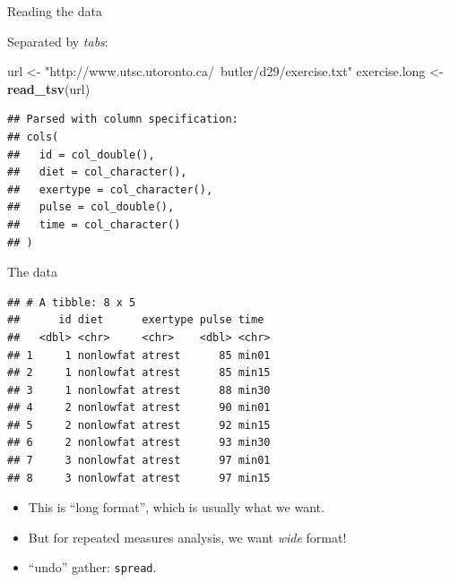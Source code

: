 \documentclass[
  ignorenonframetext,
]{beamer}
\newenvironment{Shaded}{\begin{snugshade}}{\end{snugshade}}
\newcommand{\DecValTok}[1]{\textcolor[rgb]{0.00,0.00,0.81}{#1}}
\newcommand{\KeywordTok}[1]{\textcolor[rgb]{0.13,0.29,0.53}{\textbf{#1}}}
\newcommand{\NormalTok}[1]{#1}
\newcommand{\OperatorTok}[1]{\textcolor[rgb]{0.81,0.36,0.00}{\textbf{#1}}}
\newcommand{\StringTok}[1]{\textcolor[rgb]{0.31,0.60,0.02}{#1}}
\begin{document}
\begin{frame}[fragile]{Reading the data}
\protect\hypertarget{reading-the-data-1}{}

Separated by \emph{tabs}:

\begin{Shaded}
\begin{Highlighting}[]
\NormalTok{url <-}\StringTok{ "http://www.utsc.utoronto.ca/~butler/d29/exercise.txt"}
\NormalTok{exercise.long <-}\StringTok{ }\KeywordTok{read_tsv}\NormalTok{(url)}
\end{Highlighting}
\end{Shaded}

\begin{verbatim}
## Parsed with column specification:
## cols(
##   id = col_double(),
##   diet = col_character(),
##   exertype = col_character(),
##   pulse = col_double(),
##   time = col_character()
## )
\end{verbatim}

\end{frame}

\begin{frame}[fragile]{The data}
\protect\hypertarget{the-data-11}{}

\footnotesize

\begin{Shaded}
\end{Shaded}

\begin{verbatim}
## # A tibble: 8 x 5
##      id diet      exertype pulse time 
##   <dbl> <chr>     <chr>    <dbl> <chr>
## 1     1 nonlowfat atrest      85 min01
## 2     1 nonlowfat atrest      85 min15
## 3     1 nonlowfat atrest      88 min30
## 4     2 nonlowfat atrest      90 min01
## 5     2 nonlowfat atrest      92 min15
## 6     2 nonlowfat atrest      93 min30
## 7     3 nonlowfat atrest      97 min01
## 8     3 nonlowfat atrest      97 min15
\end{verbatim}

\normalsize

\begin{itemize}
\item
  This is ``long format'', which is usually what we want.
\item
  But for repeated measures analysis, we want \emph{wide} format!
\item
  ``undo'' gather: \texttt{spread}.
\end{itemize}

\end{frame}
\end{document}

